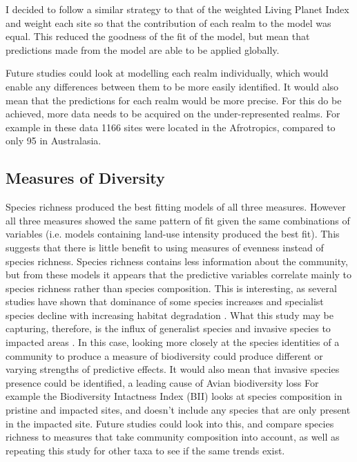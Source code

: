 \documentclass[11pt]{article}
\begin{document}
I decided to follow a similar strategy to that of the weighted Living Planet Index \parencite{Hudson2016} and weight each site so that the contribution of each realm to the model was equal. This reduced the goodness of the fit of the model, but mean that predictions made from the model are able to be applied globally.

Future studies could look at modelling each realm individually, which would enable any differences between them to be more easily identified. It would also mean that the predictions for each realm would be more precise. For this do be achieved, more data needs to be acquired on the under-represented realms. For example in these data 1166 sites were located in the Afrotropics, compared to only 95 in Australasia.

\subsection{Measures of Diversity}

Species richness produced the best fitting models of all three measures. However all three measures showed the same pattern of fit given the same combinations of variables (i.e. models containing land-use intensity produced the best fit). This suggests that there is little benefit to using measures of evenness instead of species richness. Species richness contains less information about the community, but from these models it appears that the predictive variables correlate mainly to species richness rather than species composition. This is interesting, as several studies have shown that dominance of some species increases and specialist species decline with increasing habitat degradation \parencite{Devictor2008}. What this study may be capturing, therefore, is the influx of generalist species and invasive species to impacted areas \parencite{With2004}. In this case, looking more closely at the species identities of a community to produce a measure of biodiversity could produce different or varying strengths of predictive effects. It would also mean that invasive species presence could be identified, a leading cause of Avian biodiversity loss \parencite{Clavero2009} For example the Biodiversity Intactness Index (BII) looks at species composition in pristine and impacted sites, and doesn't include any species that are only present in the impacted site. Future studies could look into this, and compare species richness to measures that take community composition into account, as well as repeating this study for other taxa to see if the same trends exist.
\end{document}
